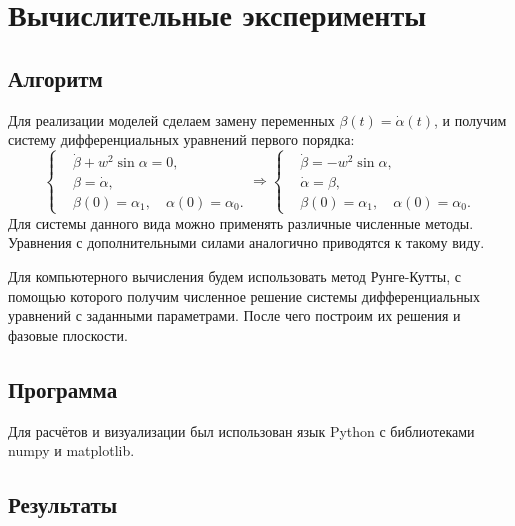 \section{Вычислительные эксперименты}

    \subsection{Алгоритм}
        Для реализации моделей сделаем замену переменных \( \beta(t) = \dot{\alpha}(t) \), и получим систему дифференциальных уравнений первого порядка:
        \[
            \begin{cases}
                & \dot{\beta} + w^2 \sin \alpha = 0, \\
                & \beta = \dot{\alpha}, \\
                & \beta(0) = \alpha_1, \quad \alpha(0) = \alpha_0.
            \end{cases} \Rightarrow
            \begin{cases}
                & \dot{\beta} = - w^2 \sin \alpha, \\
                & \dot{\alpha} = \beta, \\
                & \beta(0) = \alpha_1, \quad \alpha(0) = \alpha_0.
            \end{cases}
        \]
        Для системы данного вида можно применять различные численные методы. Уравнения с дополнительными силами аналогично приводятся к такому виду.

        Для компьютерного вычисления будем использовать метод Рунге-Кутты, с помощью которого получим численное решение системы дифференциальных уравнений с заданными параметрами. После чего построим их решения и фазовые плоскости.



    \subsection{Программа}
        Для расчётов и визуализации был использован язык Python с библиотеками numpy и matplotlib.

    \subsection{Результаты}
        